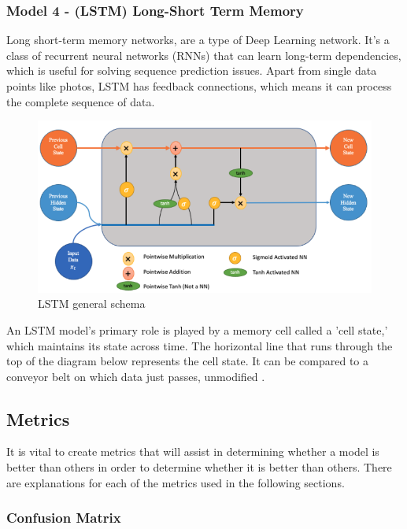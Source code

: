 \subsubsection{Model 4 - (LSTM) Long-Short Term Memory} \label{3model4}

Long short-term memory networks, are a type of Deep Learning network. It's a class of recurrent neural networks (RNNs) that can learn long-term dependencies, which is useful for solving sequence prediction issues. Apart from single data points like photos, LSTM has feedback connections, which means it can process the complete sequence of data.

\begin{figure}[h!]
\centering
\includegraphics[scale=0.5]{img/lstm.png}
\caption{LSTM general schema}
\label{fig:lstm}
\end{figure}

An LSTM model's primary role is played by a memory cell called a 'cell state,' which maintains its state across time. The horizontal line that runs through the top of the diagram below represents the cell state. It can be compared to a conveyor belt on which data just passes, unmodified \cite{lstm}.

\subsection{Metrics} \label{3metrics}

It is vital to create metrics that will assist in determining whether a model is better than others in order to determine whether it is better than others. There are explanations for each of the metrics used in the following sections.

\subsubsection{Confusion Matrix} \label{4confmatrix}

